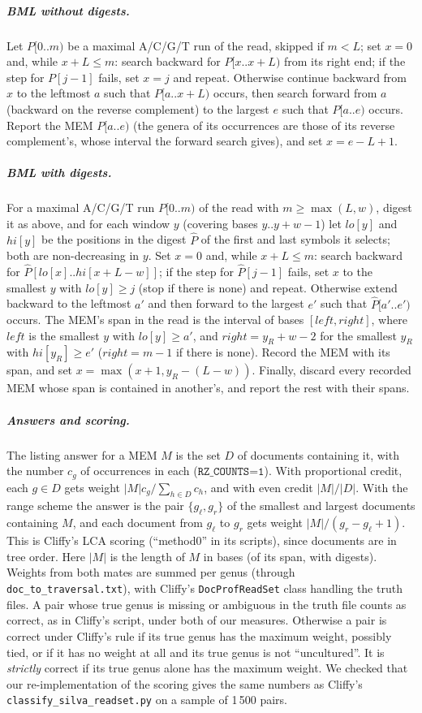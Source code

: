 \subparagraph*{BML without digests.}
Let $P[0..m)$ be a maximal A/C/G/T run of the read, skipped if $m < L$; set $x = 0$ and, while $x + L \le m$:
search backward for $P[x..x + L)$ from its right end; if the step for $P[j - 1]$ fails, set $x = j$ and repeat.
Otherwise continue backward from $x$ to the leftmost $a$ such that $P[a..x + L)$ occurs, then search forward from $a$ (backward on the reverse complement) to the largest $e$ such that $P[a..e)$ occurs.
Report the MEM $P[a..e)$ (the genera of its occurrences are those of its reverse complement's, whose interval the forward search gives), and set $x = e - L + 1$.

\subparagraph*{BML with digests.}
For a maximal A/C/G/T run $P[0..m)$ of the read with $m \ge \max(L, w)$, digest it as above, and for each window $y$ (covering bases $y..y + w - 1$) let $\mathit{lo}[y]$ and $\mathit{hi}[y]$ be the positions in the digest $\hat{P}$ of the first and last symbols it selects; both are non-decreasing in $y$.
Set $x = 0$ and, while $x + L \le m$: search backward for $\hat{P}[\mathit{lo}[x]..\mathit{hi}[x + L - w]]$; if the step for $\hat{P}[j - 1]$ fails, set $x$ to the smallest $y$ with $\mathit{lo}[y] \ge j$ (stop if there is none) and repeat.
Otherwise extend backward to the leftmost $a'$ and then forward to the largest $e'$ such that $\hat{P}[a'..e')$ occurs.
The MEM's span in the read is the interval of bases $[\mathit{left}, \mathit{right}]$, where $\mathit{left}$ is the smallest $y$ with $\mathit{lo}[y] \ge a'$, and $\mathit{right} = y_R + w - 2$ for the smallest $y_R$ with $\mathit{hi}[y_R] \ge e'$ ($\mathit{right} = m - 1$ if there is none).
Record the MEM with its span, and set $x = \max(x + 1, y_R - (L - w))$.
Finally, discard every recorded MEM whose span is contained in another's, and report the rest with their spans.

\subparagraph*{Answers and scoring.}
The listing answer for a MEM $M$ is the set $D$ of documents containing it, with the number $c_g$ of occurrences in each ($\texttt{RZ\_COUNTS=1}$).
With proportional credit, each $g \in D$ gets weight $|M| c_g / \sum_{h \in D} c_h$, and with even credit $|M|/|D|$.
With the range scheme the answer is the pair $\{g_\ell, g_r\}$ of the smallest and largest documents containing $M$, and each document from $g_\ell$ to $g_r$ gets weight $|M|/(g_r - g_\ell + 1)$.
This is Cliffy's LCA scoring (``method0'' in its scripts), since documents are in tree order.
Here $|M|$ is the length of $M$ in bases (of its span, with digests).
Weights from both mates are summed per genus (through \texttt{doc\_to\_traversal.txt}), with Cliffy's \texttt{DocProfReadSet} class handling the truth files.
A pair whose true genus is missing or ambiguous in the truth file counts as correct, as in Cliffy's script, under both of our measures.
Otherwise a pair is correct under Cliffy's rule if its true genus has the maximum weight, possibly tied, or if it has no weight at all and its true genus is not ``uncultured''.
It is \emph{strictly} correct if its true genus alone has the maximum weight.
We checked that our re-implementation of the scoring gives the same numbers as Cliffy's \texttt{classify\_silva\_readset.py} on a sample of 1\,500 pairs.

